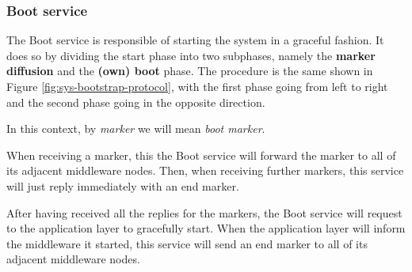 \subsubsection{Boot service}\label{sec:mw-boot-descr}

The Boot service is responsible of starting the system in a graceful fashion.
It does so by dividing the start phase into two subphases, namely the
\textbf{marker diffusion} and the \textbf{(own) boot} phase. The procedure is
the same shown in Figure \ref{fig:sys-bootstrap-protocol}, with the first phase
going from left to right and the second phase going in the opposite direction.

In this context, by \textit{marker} we will mean \textit{boot marker}.

When receiving a marker, this the Boot service will forward the marker to all
of its adjacent middleware nodes.
Then, when receiving further markers, this service will just reply immediately
with an end marker.

After having received all the replies for the markers, the Boot service will
request to the application layer to gracefully start.
When the application layer will inform the middleware it started, this service
will send an end marker to all of its adjacent middleware nodes.
